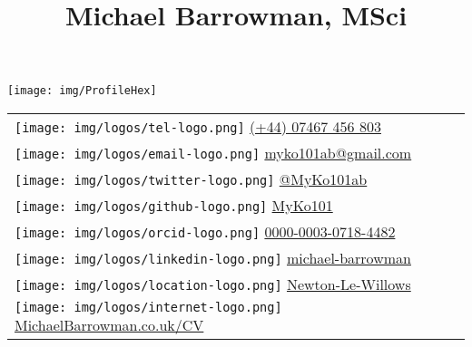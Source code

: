 \documentclass[
]{article}
\title{Michael Barrowman, MSci}
\author{}
\date{\vspace{-2.5em}}
\begin{document}
\maketitle

\newcommand{\bcols}{\begin{multicols}{2}}
\newcommand{\ecols}{\end{multicols} }
\newcommand{\iimg}[1]{\texttt{[image: \#1]}}
\renewcommand{\arraystretch}{1.7}

\setlength{\columnsep}{-2.5cm}
\def\addlinespace{}

\begin{multicols}{2}

\texttt{[image: img/ProfileHex]}

\begin{tabular}{l}
\toprule
\texttt{[image:  img/logos/tel-logo.png]} \href{ tel:+447467456803}{ (+44) 07467 456 803}\\
\texttt{[image:  img/logos/email-logo.png]} \href{ mailto:myko101ab@gmail.com}{ myko101ab@gmail.com}\\
\texttt{[image:  img/logos/twitter-logo.png]} \href{ https://twitter.com/MyKo101ab}{ @MyKo101ab}\\
\texttt{[image:  img/logos/github-logo.png]} \href{ https://github.com/MyKo101}{ MyKo101}\\
\texttt{[image:  img/logos/orcid-logo.png]} \href{ https://orcid.org/0000-0003-0718-4482}{ 0000-0003-0718-4482}\\

\texttt{[image:  img/logos/linkedin-logo.png]} \href{ https://www.linkedin.com/in/michael-barrowman-0403a960/}{ michael-barrowman}\\
\texttt{[image:  img/logos/location-logo.png]} \href{ https://www.google.com/maps/place/Newton-le-Willows/@53.4584287,-2.6730042}{ Newton-Le-Willows}\\
\texttt{[image:  img/logos/internet-logo.png]} \href{ https://MichaelBarrowman.co.uk/CV/index.html}{ MichaelBarrowman.co.uk/CV}\\
\bottomrule
\end{tabular}

\hypertarget{section}{%
\section{}\label{section}}

\hypertarget{bio}{%
}
\end{multicols}
\end{document}
